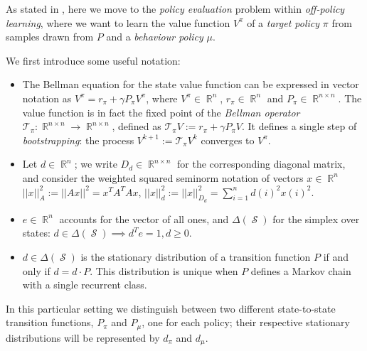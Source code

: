 \documentclass[12pt,a4paper,openright,twoside]{article}
\DeclareMathOperator*{\R}{\mathbb{R}}
\DeclareMathOperator*{\Sspace}{\mathcal{S}}
\numberwithin{equation}{section}
\theoremstyle{definition}
\theoremstyle{remark}
\theoremstyle{plain}
\begin{document}
As stated in \cite{DCOPTD}, here we move to the \textit{policy evaluation} problem within \textit{off-policy learning}, where we want to learn the value function $V^\pi$ of a \textit{target policy} $\pi$ from samples drawn from $P$ and a \textit{behaviour policy} $\mu$. 

We first introduce some useful notation:
\begin{itemize}
    \item The Bellman equation for the state value function can be expressed in vector notation as $V^\pi = r_\pi + \gamma P_\pi V^\pi$, where $V^\pi \in \R^{n}$, $r_\pi \in \R^n$ and $P_\pi \in \R^{n \times n}$. The value function is in fact the fixed point of the \textit{Bellman operator} $\mathcal{T}_\pi: \R^{n \times n} \rightarrow \R^{n \times n}$, defined as $\mathcal{T}_\pi V := r_\pi + \gamma P_\pi V $. It defines a single step of \textit{bootstrapping}: the process $V^{k+1} := \mathcal{T}_\pi V^k$ converges to $V^\pi$.
    \item Let $d \in \R^n$; we write $D_d \in \R^{n\times n}$ for the corresponding diagonal matrix, and consider the weighted squared seminorm notation of vectors $x\in\R^n$ $||x||^2_{A} := ||A x||^2 = x^T A^T A x$, $||x||^2_d :=||x||^2_{D_d}= \sum_{i=1}^n d(i)^2 x(i)^2$.
    \item $e\in\R^n$ accounts for the vector of all ones, and $\Delta(\Sspace)$ for the simplex over states: $d \in \Delta(\Sspace) \implies d^T e = 1, d \geq 0$.
    \item $d \in \Delta(\Sspace)$ is the stationary distribution of a transition function $P$ if and only if $d=d \cdot P$. This distribution is unique when $P$ defines a Markov chain with a single recurrent class\cite{unichain}.
\end{itemize}
In this particular setting we distinguish between two different state-to-state transition functions, $P_\pi$ and $P_\mu$, one for each policy; their respective stationary distributions will be represented by $d_\pi$ and $d_\mu$. 
\end{document}
